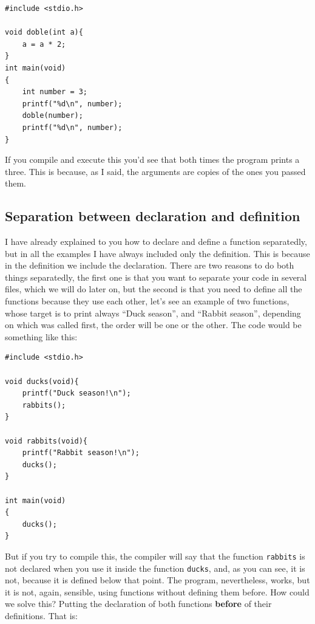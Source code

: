 \documentclass[a4paper]{article}
\begin{document}
\noindent
\begin{minipage}[H]{\linewidth}
\mbox{}
\begin{lstlisting}[style=C, label={lst:functionByValue},
caption={Demonstration that a function receives copies of the arguments}]
#include <stdio.h>

void doble(int a){
    a = a * 2;
}
int main(void)
{
    int number = 3;
    printf("%d\n", number);
    doble(number);
    printf("%d\n", number);
}
\end{lstlisting}
\end{minipage}

If you compile and execute this you'd see that both times the program prints
a three. This is because, as I said, the arguments are copies of the ones
you passed them.

\subsection{Separation between declaration and definition}
I have already explained to you how to declare and define a function
separatedly, but in all the examples I have always included only the definition.
This is because in the definition we include the declaration. There are two
reasons to do both things separatedly, the first one is that you want to
separate your code in several files, which we will do later on, but the second
is that you need to define all the functions because they use each other, let's
see an example of two functions, whose target is to print always
``Duck season'', and ``Rabbit season'', depending on which was called first,
the order will be one or the other. The code would be something like this:

\noindent
\begin{minipage}[H]{\linewidth}
\mbox{}
\begin{lstlisting}[style=C, label={lst:cyclicFunctions},
caption={Declaration separated from definition}]
#include <stdio.h>

void ducks(void){
    printf("Duck season!\n");
    rabbits();
}

void rabbits(void){
    printf("Rabbit season!\n");
    ducks();
}

int main(void)
{
    ducks();
}
\end{lstlisting}
\end{minipage}

But if you try to compile this, the compiler will say that the function
\verb!rabbits! is not declared when you use it inside the function \verb!ducks!,
and, as you can see, it is not, because it is defined below that point. The
program, nevertheless, works, but it is not, again, sensible, using functions
without defining them before.
How could we solve this? Putting the declaration of both functions
\textbf{before} of their definitions. That is:
\end{document}
